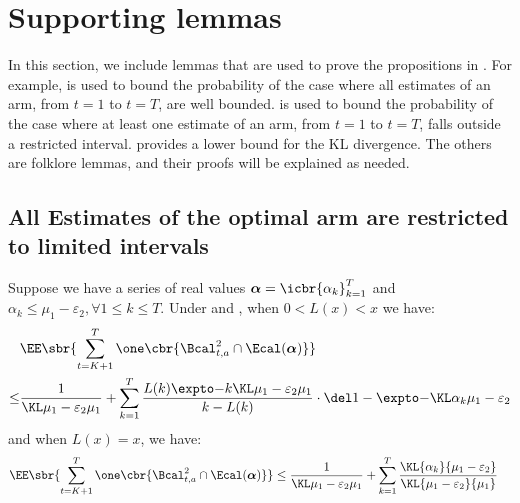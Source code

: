     
\section{Supporting lemmas} \label{sec:supporting-lemma}
    In this section, we include lemmas that are used to prove the propositions in . For example,  is used to bound the probability of the case where all estimates of an arm, from $t=1$ to $t=T$, are well bounded.  is used to bound the probability of the case where at least one estimate of an arm, from $t=1$ to $t=T$, falls outside a restricted interval.  provides a lower bound for the KL divergence. The others are folklore lemmas, and their proofs will be explained as needed.

    \subsection{All Estimates of the optimal arm are restricted to limited intervals}
    \begin{lemma} \label{lemma:bad-2-bounded}
        Suppose we have a series of real values $\boldsymbol{\alpha} = \icbr{\alpha_k}_{k=1}^T$ and $\alpha_k \leq \mu_1 - \varepsilon_2, \forall 1 \leq k \leq T$. 
        Under  and , when $0 < L(x) < x$ we have:
        \begin{align}
            & \EE \sbr{ 
            \sum_{t=K+1}^T
            \one\cbr{ \Bcal^2_{t, a} \cap \Ecal(\boldsymbol{\alpha}) }
            }
                \nonumber
            \\
            \leq&
            \ExpFThreeOne
                \label{eqn:bad-2-bounded}
        \end{align}
        and when $L(x) = x$, we have:
        \begin{align}
            & \EE \sbr{ 
            \sum_{t=K+1}^T
            \one\cbr{ \Bcal^2_{t, a} \cap \Ecal(\boldsymbol{\alpha}) }
            }
            \leq
            \ExpFThreeOneA +
            \sum_{k=1}^{T}
            \frac{\KL{\alpha_k}{\mu_1 - \varepsilon_2}}{\KL{\mu_1 - \varepsilon_2}{\mu_1}}
        \end{align}
    \end{lemma}
    

